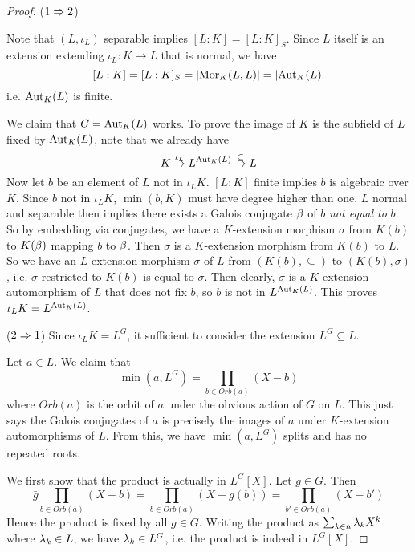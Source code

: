 \documentclass[../book.tex]{subfiles}
\begin{document}
\begin{proof}
    ($1\Rightarrow 2$)
        
        Note that $(L,\iota_L)$ separable implies $[L:K] = [L:K]_S$.
        Since $L$ itself is an extension extending $\iota_L : K \to L$ that is normal,
        we have \[
            [L : K] = [L : K]_S = |\text{Mor}_{K}(L, L)| = |\text{Aut}_{K}(L)|
        \]
        i.e. $\text{Aut}_{K}(L)$ is finite. 
        
        We claim that $G = \text{Aut}_{K}(L)$ works. 
        To prove the image of $K$ is the subfield of $L$ fixed by $\text{Aut}_{K}(L)$,
        note that we already have \[
            K \overset{\iota_L}{\to} L^{\text{Aut}_{K}(L)} \overset{\subseteq}{\to} L
        \]
        Now let $b$ be an element of $L$ not in $\iota_L K$. 
        $[L : K]$ finite implies $b$ is algebraic over $K$. 
        Since $b$ not in $\iota_L K$, $\min(b,K)$ must have degree higher than one. 
        $L$ normal and separable then implies 
        there exists a Galois conjugate $\beta$ of $b$ \emph{not equal to} $b$. 
        So by embedding via conjugates, 
        we have a $K$-extension morphism $\sigma$ 
        from $K(b)$ to $K(\beta)$ mapping $b$ to $\beta$.
        Then $\sigma$ is a $K$-extension morphism from $K(b)$ to $L$.
        So we have an $L$-extension morphism $\bar{\sigma}$ of $L$
        from $(K(b),\subseteq)$ to $(K(b),\sigma)$, 
        i.e. $\bar{\sigma}$ restricted to $K(b)$ is equal to $\sigma$. 
        Then clearly, $\bar{\sigma}$ is a $K$-extension automorphism of $L$
        that does not fix $b$, 
        so $b$ is not in $L^{\text{Aut}_{K}(L)}$.
        This proves $\iota_L K = L^{\text{Aut}_{K}(L)}$. 
        
    ($2\Rightarrow 1$)
        Since $\iota_L K = L^G$, it sufficient to consider the extension 
        $L^G \subseteq L$. 
        
        Let $a \in L$. We claim that \[
            \min(a,L^G) = \prod_{b \in Orb(a)} (X - b)
        \]
        where $Orb(a)$ is the orbit of $a$ under the obvious action of $G$ on $L$. 
        This just says the Galois conjugates of $a$ is precisely
        the images of $a$ under $K$-extension automorphisms of $L$. 
        From this, we have $\min(a,L^G)$ splits and has no repeated roots. 
    
        We first show that the product is actually in $L^G[X]$. 
        Let $g \in G$. Then \[
            \bar{g} \prod_{b \in Orb(a)} (X - b) 
            = \prod_{b \in Orb(a)} (X - g(b)) = \prod_{b' \in Orb(a)} (X - b')
        \]
        Hence the product is fixed by all $g \in G$. 
        Writing the product as $\sum_{k\in n} \lambda_k X^k$ where $\lambda_k \in L$,
        we have $\lambda_k \in L^G$, i.e. the product is indeed in $L^G[X]$. 
    

\end{proof}
\end{document}
